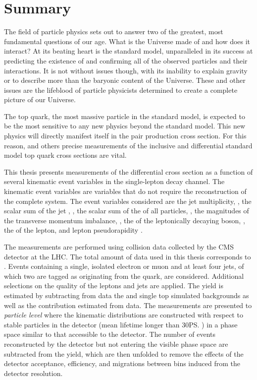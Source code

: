 \chapter*{Summary}
\label{ch:summary}

The field of particle physics sets out to answer two of the greatest, most fundamental questions of our age.
What is the Universe made of and how does it interact?
At its beating heart is the standard model, unparalleled in its success at predicting the existence of and confirming all of the observed particles and their interactions.
It is not without issues though, with its inability to explain gravity or to describe more than the baryonic content of the Universe.
These and other issues are the lifeblood of particle physicists determined to create a complete picture of our Universe.

The top quark, the most massive particle in the standard model, is expected to be the most sensitive to any new physics beyond the standard model.
This new physics will directly manifest itself in the \ttbar{} pair production cross section.
For this reason, and others precise measurements of the inclusive and differential standard model top quark cross sections are vital.

This thesis presents measurements of the differential cross section as a function of several kinematic event variables in the single-lepton decay channel.
The kinematic event variables are variables that do not require the reconstruction of the complete \ttbar{} system.
The event variables considered are the jet multiplicity, \NJET{}, the scalar sum of the jet \pt{}, \HT{}, the scalar sum of the \pt{} of all particles, \ST{}, the magnitudes of the transverse momentum imbalance, \ptmiss{}, the \pt{} of the leptonically decaying \Wboson{} boson, \WPT{}, the \pt{} of the lepton, \LPT{} and lepton pseudorapidity \LETA{}.

The measurements are performed using collision data collected by the CMS detector at the LHC.
The total amount of data used in this thesis corresponds to \Lumi.
Events containing a single, isolated electron or muon and at least four jets, of which two are tagged as originating from the \bquark{} quark, are considered.
Additional selections on the quality of the leptons and jets are applied.
The \ttbar{} yield is estimated by subtracting from data the \Vjets{} and single top simulated backgrounds as well as the \QCD{} contribution estimated from data.
The measurements are presented to \textit{particle level} where the kinematic distributions are constructed with respect to stable particles in the detector (mean lifetime longer than 30\ps{}) in a phase space similar to that accessible to the detector.
The number of events reconstructed by the detector but not entering the visible phase space are subtracted from the \ttbar{} yield, which are then unfolded to remove the effects of the detector acceptance, efficiency, and migrations between bins induced from the detector resolution. 

